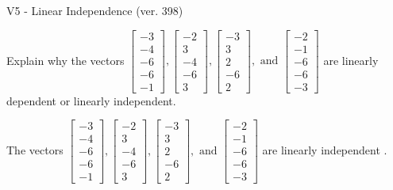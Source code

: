 \begin{exercise}
  \begin{exerciseTitle}V5 - Linear Independence (ver. 398)\end{exerciseTitle}
  \begin{exerciseStatement}
    Explain why the vectors \(\left[\begin{array}{r}
-3 \\
-4 \\
-6 \\
-6 \\
-1
\end{array}\right] , \left[\begin{array}{r}
-2 \\
3 \\
-4 \\
-6 \\
3
\end{array}\right] , \left[\begin{array}{r}
-3 \\
3 \\
2 \\
-6 \\
2
\end{array}\right] , \text{ and } \left[\begin{array}{r}
-2 \\
-1 \\
-6 \\
-6 \\
-3
\end{array}\right]\) are linearly dependent or linearly independent.	


  \end{exerciseStatement}
  \begin{exerciseAnswer}
   The vectors \(\left[\begin{array}{r}
-3 \\
-4 \\
-6 \\
-6 \\
-1
\end{array}\right] , \left[\begin{array}{r}
-2 \\
3 \\
-4 \\
-6 \\
3
\end{array}\right] , \left[\begin{array}{r}
-3 \\
3 \\
2 \\
-6 \\
2
\end{array}\right] , \text{ and } \left[\begin{array}{r}
-2 \\
-1 \\
-6 \\
-6 \\
-3
\end{array}\right]\) are 
  	 linearly independent  .
  


  \end{exerciseAnswer}
\end{exercise}